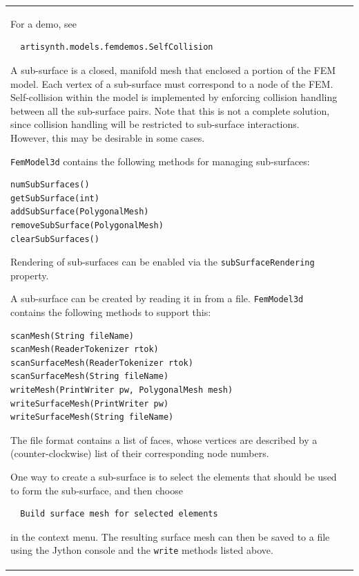 \documentclass{article}
\begin{document}
\begin{tabular}{ll}
\begin{itemize}
\end{itemize}

For a demo, see 

\begin{verbatim}
  artisynth.models.femdemos.SelfCollision
\end{verbatim}

A sub-surface is a closed, manifold mesh that enclosed a portion of
the FEM model. Each vertex of a sub-surface must correspond to a node
of the FEM. Self-collision within the model is implemented by
enforcing collision handling between all the sub-surface pairs.  Note
that this is not a complete solution, since collision handling will be
restricted to sub-surface interactions. However, this may be desirable
in some cases.

{\tt FemModel3d} contains the following methods for managing sub-surfaces:

\begin{lstlisting}[]
numSubSurfaces()
getSubSurface(int)
addSubSurface(PolygonalMesh)
removeSubSurface(PolygonalMesh)
clearSubSurfaces()
\end{lstlisting}

Rendering of sub-surfaces can be enabled via the
{\tt subSurfaceRendering} property.

A sub-surface can be created by reading it in from a file. {\tt FemModel3d}
contains the following methods to support this:

\begin{lstlisting}[]
scanMesh(String fileName)
scanMesh(ReaderTokenizer rtok)
scanSurfaceMesh(ReaderTokenizer rtok)
scanSurfaceMesh(String fileName)
writeMesh(PrintWriter pw, PolygonalMesh mesh)
writeSurfaceMesh(PrintWriter pw)
writeSurfaceMesh(String fileName)
\end{lstlisting}

The file format contains a list of faces, whose vertices are described
by a (counter-clockwise) list of their corresponding node numbers.

One way to create a sub-surface is to select the elements that should
be used to form the sub-surface, and then choose

\begin{verbatim}
  Build surface mesh for selected elements
\end{verbatim}

in the context menu. The resulting surface mesh can then be saved to a
file using the Jython console and the {\tt write} methods listed above.


\end{tabular}
\end{document}
